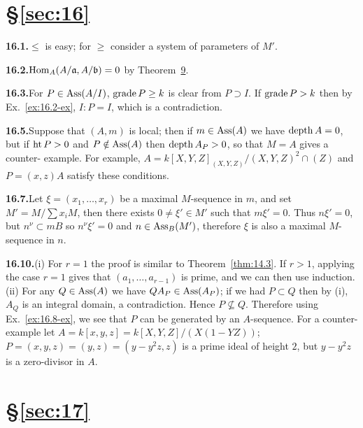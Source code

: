 
\section*{\S\ref{sec:16}}

\noindent\textbf{16.1.}\quad $\le$ is easy; for $\ge$ consider a system of parameters of $M'$.

\noindent\textbf{16.2.}\quad $\operatorname{Hom}_A(A/\mathfrak{a}, A/\mathfrak{b}) = 0$ by Theorem~\hyperref[thm:16.9]{9}.

\noindent\textbf{16.3.}\quad For $P \in \operatorname{Ass}(A/I)$, $\operatorname{grade} P \ge k$ is clear from $P \supset I$. If $\operatorname{grade} P > k$ then by
Ex.~\ref{ex:16.2-ex}, $I:P = I$, which is a contradiction.

\noindent\textbf{16.5.}\quad Suppose that $(A, m)$ is local; then if $m \in \operatorname{Ass}(A)$ we have $\operatorname{depth} A = 0$, but if
$\operatorname{ht} P > 0$ and $P \notin \operatorname{Ass}(A)$ then $\operatorname{depth} A_P > 0$, so that $M = A$ gives a counter-
example. For example, $A = k[X, Y, Z]_{(X,Y,Z)}/(X, Y, Z)^2 \cap (Z)$ and $P = (x, z)A$
satisfy these conditions.

\noindent\textbf{16.7.}\quad Let $\xi = (x_1, \ldots, x_r)$ be a maximal $M$-sequence in $m$, and set $M' = M/\sum x_iM$,
then there exists $0 \neq \xi' \in M'$ such that $m\xi' = 0$. Thus $n\xi' = 0$, but $n^\nu \subset mB$
so $n^\nu\xi' = 0$ and $n \in \operatorname{Ass}_B(M')$, therefore $\xi$ is also a maximal $M$-sequence in $n$.

\noindent\textbf{16.10.}\quad (i) For $r = 1$ the proof is similar to Theorem~\ref{thm:14.3}. If $r > 1$, applying the case
$r = 1$ gives that $(a_1, \ldots, a_{r-1})$ is prime, and we can then use induction. (ii) For
any $Q \in \operatorname{Ass}(A)$ we have $QA_P \in \operatorname{Ass}(A_P)$; if we had $P \subset Q$ then by (i), $A_Q$
is an integral domain, a contradiction. Hence $P \nsubseteq Q$. Therefore using
Ex.~\ref{ex:16.8-ex}, we see that $P$ can be generated by an $A$-sequence. For a counter-
example let $A = k[x, y, z] = k[X, Y, Z]/(X(1 - YZ))$; $P = (x, y, z) = (y, z) = (y - y^2z, z)$
is a prime ideal of height $2$, but $y - y^2z$ is a zero-divisor in $A$.

\section*{\S\ref{sec:17}}

